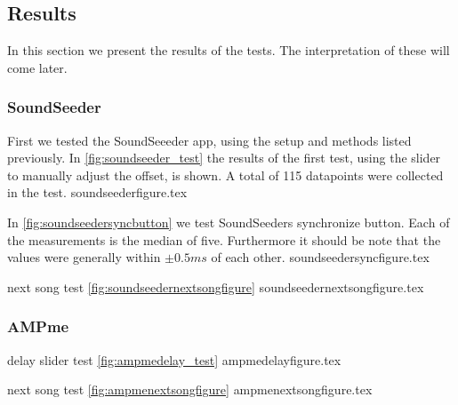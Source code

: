 \subsection{Results}
In this section we present the results of the tests.
The interpretation of these will come later.
\subsubsection{SoundSeeder}
First we tested the SoundSeeeder app, using the setup and methods listed previously. 
In \vref{fig:soundseeder_test} the results of the first test, using the slider to manually adjust the offset, is shown. 
A total of 115 datapoints were collected in the test.
{soundseederfigure.tex}

In \vref{fig:soundseedersyncbutton} we test SoundSeeders synchronize button.
Each of the measurements is the median of five. 
Furthermore it should be note that the values were generally within $\pm 0.5 ms$ of each other. 
{soundseedersyncfigure.tex}

next song test \vref{fig:soundseedernextsongfigure}
{soundseedernextsongfigure.tex}

\subsubsection{AMPme}
delay slider test \vref{fig:ampmedelay_test}
{ampmedelayfigure.tex}

next song test \vref{fig:ampmenextsongfigure}
{ampmenextsongfigure.tex}

